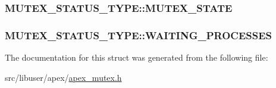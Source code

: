 \subsubsection[{\texorpdfstring{M\+U\+T\+E\+X\+\_\+\+S\+T\+A\+TE}{MUTEX_STATE}}]{ M\+U\+T\+E\+X\+\_\+\+S\+T\+A\+T\+U\+S\+\_\+\+T\+Y\+P\+E\+::\+M\+U\+T\+E\+X\+\_\+\+S\+T\+A\+TE}\hypertarget{structMUTEX__STATUS__TYPE_ac7e49dde3fc5d295e19f8b5dad03527a}{}\label{structMUTEX__STATUS__TYPE_ac7e49dde3fc5d295e19f8b5dad03527a}
\subsubsection[{\texorpdfstring{W\+A\+I\+T\+I\+N\+G\+\_\+\+P\+R\+O\+C\+E\+S\+S\+ES}{WAITING_PROCESSES}}]{ M\+U\+T\+E\+X\+\_\+\+S\+T\+A\+T\+U\+S\+\_\+\+T\+Y\+P\+E\+::\+W\+A\+I\+T\+I\+N\+G\+\_\+\+P\+R\+O\+C\+E\+S\+S\+ES}\hypertarget{structMUTEX__STATUS__TYPE_ac944df960cdb84125b3e25e5e65f0cb2}{}\label{structMUTEX__STATUS__TYPE_ac944df960cdb84125b3e25e5e65f0cb2}


The documentation for this struct was generated from the following file\+:\begin{DoxyCompactItemize}
\item 
src/libuser/apex/\hyperlink{apex__mutex_8h}{apex\+\_\+mutex.\+h}\end{DoxyCompactItemize}
